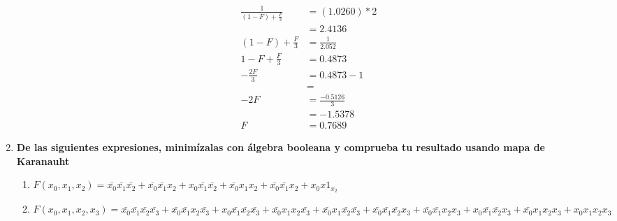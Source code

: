 \documentclass[14pt,letterpaper,fleqn]{article}
\begin{document}
\begin{enumerate}
\begin{equation*}
                \begin{split}
                \frac{1}{(1-F)+\frac{F}{3}} & = (1.0260) * 2\\
                 & = 2.4136 \\
                 (1-F) + \frac{F}{3} & = \frac{1}{2.052} \\
                 1 - F + \frac{F}{3} & = 0.4873 \\
                 -\frac{2F}{3} & = 0.4873 - 1 \\
                  & = \\
                 -2F & = \frac{−0.5126}{3}\\
                 & = −1.5378\\
                 F &= 0.7689
                \end{split}
            \end{equation*}
        \item \textbf{De las siguientes expresiones, minimízalas con álgebra booleana y comprueba tu resultado usando mapa de Karanauht}
        \begin{enumerate}
            \item \textbf{$F(x_0, x_1, x_2) = \bar{x_0}\bar{x_1}\bar{x_2} + \bar{x_0}\bar{x_1}x_2 + x_0\bar{x_1}\bar{x_2} + \bar{x_0}x_1x_2 + \bar{x_0}\bar{x_1}x_2 + x_0x1_x_2$}
            \\
            
            \item \textbf{$F(x_0, x_1, x_2, x_3) = \bar{x_0}\bar{x_1}\bar{x_2}\bar{x_3} + \bar{x_0}\bar{x_1}x_2\bar{x_3} + x_0\bar{x_1}\bar{x_2}\bar{x_3} + \bar{x_0}x_1x_2\bar{x_3} + \bar{x_0}x_1\bar{x_2}\bar{x_3} + \bar{x_0}\bar{x_1}\bar{x_2}x_3 + \bar{x_0}\bar{x_1}x_2x_3 + x_0\bar{x_1}\bar{x_2}x_3 + \bar{x_0}x_1x_2x_3 + x_0x_1x_2x_3$}
            
        \end{enumerate}
        
    \end{enumerate}
\end{document}

